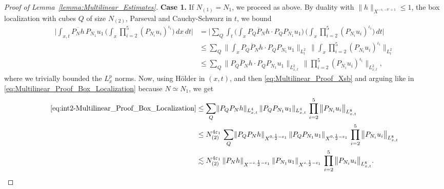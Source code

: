 \documentclass[11pt, xcolor = dvipsnames,reqno
]{amsart}
\theoremstyle{definition}
\theoremstyle{remark}
\begin{document}
\begin{proof}[Proof of Lemma~\ref{lemma:Multilinear_Estimates}]
\textbf{Case 1.} 
If $N_{(1)} = N_1$, we proceed as above. By duality with $\lVert h \rVert_{X^{-s, -b'+1}} \leq 1$, the box localization with cubes $Q$ of size $N_{(2)}$, 
Parseval and Cauchy-Schwarz in $t$, we bound
\begin{align}\label{eq:int2-Multilinear_Proof_Box_Localization}
    \Big| \int_{x,t} \overline{P_N h} \,  P_{N_1} u_1 \, \bigg(\int_x \prod_{i=2}^5 (P_{N_i} u_i)^{\iota_i} \bigg) \, dx\, dt \Big|
    & = \Big| \sum_{Q} \int_t \bigg( \int_x \overline{P_Q P_N h} \cdot  P_Q P_{N_1} u_1 \bigg) \,
    \bigg(\int_x \prod_{i=2}^5 (P_{N_i} u_i)^{\iota_i} \bigg) \, dt \Big| \nonumber
    \\
    & \leq \sum_{Q} 
    \bigg\lVert \int_x \overline{P_Q P_N h} \cdot P_Q P_{N_1} u_1\bigg\rVert_{L^2_t} 
    \, \Big\lVert \int_x \prod_{i=2}^5 (P_{N_i} u_i)^{\iota_i} \Big\rVert_{L^2_t} \nonumber \\
    & \leq 
    \sum_{Q} \big\lVert \overline{P_Q P_N h} \cdot P_Q P_{N_1} u_1 \big\rVert_{L^2_{x,t}} 
    \, \Big\lVert \prod_{i=2}^5 (P_{N_i} u_i)^{\iota_i} \Big\rVert_{L^2_{x,t}}, 
\end{align}
where we trivially bounded the $L^p_x$ norms. 
Now, using H\"older in $(x,t)$, and then \eqref{eq:Multilinear_Proof_Xsb} and arguing like in \eqref{eq:Multilinear_Proof_Box_Localization} because $N \simeq N_1$, we get 
\begin{align}
    \eqref{eq:int2-Multilinear_Proof_Box_Localization} & \leq 
    \sum_{Q} 
    \lVert P_Q P_N h  \rVert_{L^4_{x,t}} \, 
    \lVert  P_Q P_{N_1} u_1 \rVert_{L^4_{x,t}} 
    \, \prod_{i=2}^5 
    \big\lVert  P_{N_i} u_i \big\rVert_{L^8_{x,t}} \\
    & \leq 
    N_{(2)}^{4\varepsilon_1} \, \sum_{Q} 
    \lVert P_Q P_N h  \rVert_{X^{0,\frac{1}{2}-\varepsilon_1}} \, 
    \lVert  P_Q P_{N_1} u_1 \rVert_{X^{0,\frac{1}{2}-\varepsilon_1}} 
    \, \prod_{i=2}^5 
    \big\lVert  P_{N_i} u_i \big\rVert_{L^8_{x,t}} \\
    & \lesssim 
    N_{(2)}^{4\varepsilon_1}  \,
    \lVert  P_N h \rVert_{X^{-s, \frac{1}{2} - \varepsilon_1}} \, 
    \lVert  P_{N_1} u_1 \rVert_{X^{s, \frac{1}{2} - \varepsilon_1}} \, 
    \prod_{i=2}^5 
    \big\lVert  P_{N_i} u_i \big\rVert_{L^8_{x,t}}.
\end{align}




\end{proof}
\end{document}

